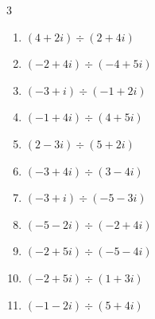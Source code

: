 \begin{multicols}{3}
\begin{enumerate}

  \item $\displaystyle (4+2i)\div(2+4i)$


  \item $\displaystyle (-2+4i)\div(-4+5i)$


  \item $\displaystyle (-3+i)\div(-1+2i)$

        \phantom{$\displaystyle =1+i$}

  \item $\displaystyle (-1+4i)\div(4+5i)$


  \item $\displaystyle (2-3i)\div(5+2i)$


  \item $\displaystyle (-3+4i)\div(3-4i)$

        \phantom{$\displaystyle =-1$}

  \item $\displaystyle (-3+i)\div(-5-3i)$


  \item $\displaystyle (-5-2i)\div(-2+4i)$


  \item $\displaystyle (-2+5i)\div(-5-4i)$


\columnbreak %

  \item $\displaystyle (-2+5i)\div(1+3i)$


  \item $\displaystyle (-1-2i)\div(5+4i)$



\end{enumerate}
\end{multicols}
